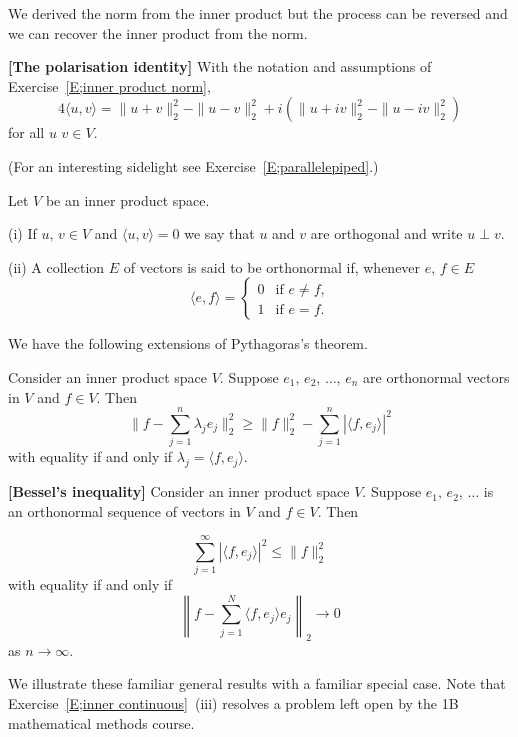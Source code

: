 We derived the norm from the inner product but the process can be reversed
and we can
recover the inner product from the norm.
\begin{exercise} {\bf [The polarisation identity]}\label{E;polarisation}
With the notation and assumptions
of Exercise~\ref{E;inner product norm},
\[4\langle u,v\rangle=\|u+v\|_{2}^{2}-\|u-v\|_{2}^{2}
+i(\|u+iv\|_{2}^{2}-\|u-iv\|_{2}^{2})\]
for all $u\,\,v\in V$.
\end{exercise}
(For an interesting sidelight see Exercise~\ref{E;parallelepiped}.)
\begin{definition} Let $V$ be an inner product space.

(i) If $u,\,v\in V$ and $\langle u,v\rangle=0$
we say that $u$ and $v$ are orthogonal
and write $u\perp v$.

(ii) A collection $E$ of vectors is said to be orthonormal
if, whenever $e,\,f\in E$
\[\langle e,f\rangle
=\begin{cases}
0&\text{if $e\neq f$,}\\
1&\text{if $e=f$.}
\end{cases}\]
\end{definition}
We have the following extensions of Pythagoras's theorem.
\begin{exercise} Consider an inner product space $V$.
Suppose $e_{1},\,e_{2},\,\dots,\,e_{n}$ are orthonormal
vectors in $V$ and $f\in V$. Then
\[\|f-\sum_{j=1}^{n}\lambda_{j}e_{j}\|_{2}^{2}
\geq \|f\|_{2}^{2}-\sum_{j=1}^{n}|\langle f,e_{j}\rangle|^{2}\]
with equality if and only if $\lambda_{j}=\langle f,e_{j}\rangle$.
\end{exercise}
\begin{theorem} {\bf [Bessel's inequality]}
Consider an inner product space $V$.
Suppose $e_{1},\,e_{2},\,\dots$ is an orthonormal
sequence of vectors in $V$ and $f\in V$. Then

\[
\sum_{j=1}^{\infty}|\langle f,e_{j}\rangle|^{2}
\leq \|f\|_{2}^{2}\]
with equality if and only if
\[\left\|f-\sum_{j=1}^{N}\langle f,e_{j}\rangle e_{j}\right\|_{2}
\rightarrow 0\]
as $n\rightarrow\infty$.
\end{theorem}
We illustrate these familiar general results with
a familiar special case. Note that Exercise~\ref{E;inner continuous}~(iii)
resolves a problem left open by the 1B mathematical methods course.
